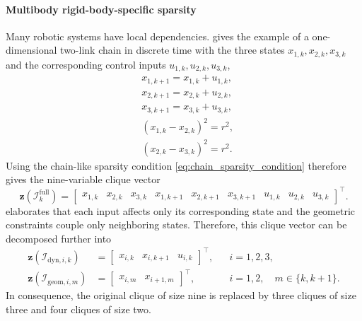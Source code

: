 \paragraph{Multibody rigid-body-specific sparsity}
Many robotic systems have local dependencies. 
\cite{Kang_2025Global} gives the example of a 
one-dimensional two-link chain in discrete time 
with the three states $x_{1,k}, x_{2,k}, x_{3,k}$ and the corresponding
control inputs $u_{1,k},u_{2,k},u_{3,k}$,
\begin{align}
&x_{1,k+1} = x_{1,k}+u_{1,k},\\
&x_{2,k+1} = x_{2,k}+u_{2,k},\\
&x_{3,k+1} = x_{3,k}+u_{3,k},\\
&(x_{1,k}-x_{2,k})^2 = r^2, \\
&(x_{2,k}-x_{3,k})^2 = r^2.
\end{align}
Using the chain-like sparsity condition
\eqref{eq:chain_sparsity_condition} therefore gives the nine-variable clique vector
\begin{equation}
\bm{z}(\mathcal I_k^{\mathrm{full}})
=
\begin{bmatrix}
x_{1,k}&x_{2,k}&x_{3,k}&x_{1,k+1}&x_{2,k+1}&x_{3,k+1}&u_{1,k}&u_{2,k}&u_{3,k}
\end{bmatrix}^{\top}.
\end{equation}
\cite{Kang_2025Global} elaborates that each input affects only its corresponding 
state and the geometric constraints couple only neighboring states.
Therefore, this clique vector can be decomposed further into
\begin{align}
\bm{z}(\mathcal I_{\mathrm{dyn},i,k})
&=\begin{bmatrix}x_{i,k}&x_{i,k+1}&u_{i,k}\end{bmatrix}^{\top},
&&i=1,2,3,\\
\bm{z}(\mathcal I_{\mathrm{geom},i,m})
&=\begin{bmatrix}x_{i,m}&x_{i+1,m}\end{bmatrix}^{\top},
&&i=1,2,\quad m\in\{k,k+1\}.
\end{align}
In consequence, the original clique of size nine is replaced by three 
cliques of size three and four cliques of size two.

